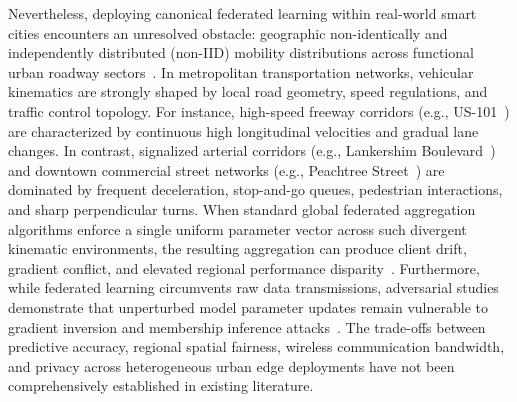 \documentclass[journal]{IEEEtran}
\begin{document}
Nevertheless, deploying canonical federated learning within real-world smart cities encounters an unresolved obstacle: geographic non-identically and independently distributed (non-IID) mobility distributions across functional urban roadway sectors~\cite{fhwa2006ngsim}. In metropolitan transportation networks, vehicular kinematics are strongly shaped by local road geometry, speed regulations, and traffic control topology. For instance, high-speed freeway corridors (e.g., US-101~\cite{fhwa2006ngsim}) are characterized by continuous high longitudinal velocities and gradual lane changes. In contrast, signalized arterial corridors (e.g., Lankershim Boulevard~\cite{fhwa2006ngsim}) and downtown commercial street networks (e.g., Peachtree Street~\cite{fhwa2006ngsim}) are dominated by frequent deceleration, stop-and-go queues, pedestrian interactions, and sharp perpendicular turns. When standard global federated aggregation algorithms enforce a single uniform parameter vector across such divergent kinematic environments, the resulting aggregation can produce client drift, gradient conflict, and elevated regional performance disparity~\cite{lee2024layerwise}. Furthermore, while federated learning circumvents raw data transmissions, adversarial studies demonstrate that unperturbed model parameter updates remain vulnerable to gradient inversion and membership inference attacks~\cite{zhu2019deep,zhao2020idlg,shokri2017membership}. The trade-offs between predictive accuracy, regional spatial fairness, wireless communication bandwidth, and privacy across heterogeneous urban edge deployments have not been comprehensively established in existing literature.
\end{document}

